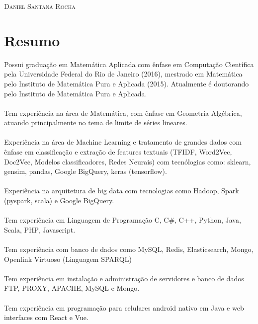 \documentclass[a4paper, oneside, final]{scrartcl} %
\begin{document}
\begin{center} %


{\fontsize{36}{36}\selectfont\scshape Daniel Santana Rocha} %

\vspace{1.5cm} %


\end{center}
\section{Resumo}

Possui graduação em Matemática Aplicada com ênfase em Computação Científica pela Universidade Federal do Rio de Janeiro (2016), mestrado em Matemática pelo Instituto de Matemática Pura e Aplicada (2015). Atualmente é doutorando pelo Instituto de Matemática Pura e Aplicada.
\\ \\
Tem experiência na área de Matemática, com ênfase em Geometria Algébrica, atuando principalmente no tema de limite de séries lineares.
\\ \\
Experiência na área de Machine Learning e tratamento de grandes dados com ênfase em classificação e extração de features textuais (TFIDF, Word2Vec, Doc2Vec, Modelos classificadores, Redes Neurais) com tecnólogias como: sklearn, gensim, pandas, Google BigQuery, keras (tensorflow).
\\ \\
Experiência na arquitetura de big data com tecnologias como Hadoop, Spark (pyspark, scala) e Google BigQuery.
\\ \\
Tem experiência em Linguagem de Programação C, C\#, C++, Python, Java, Scala, PHP, Javascript.
\\ \\
Tem experiência com banco de dados como MySQL, Redis, Elasticsearch, Mongo, Openlink Virtuoso (Linguagem SPARQL)
\\ \\
Tem experiência em instalação e administração de servidores e banco de dados FTP, PROXY, APACHE, MySQL e Mongo.
\\ \\
Tem experiência em programação para celulares android nativo em Java e web interfaces com React e Vue.
\end{document}
